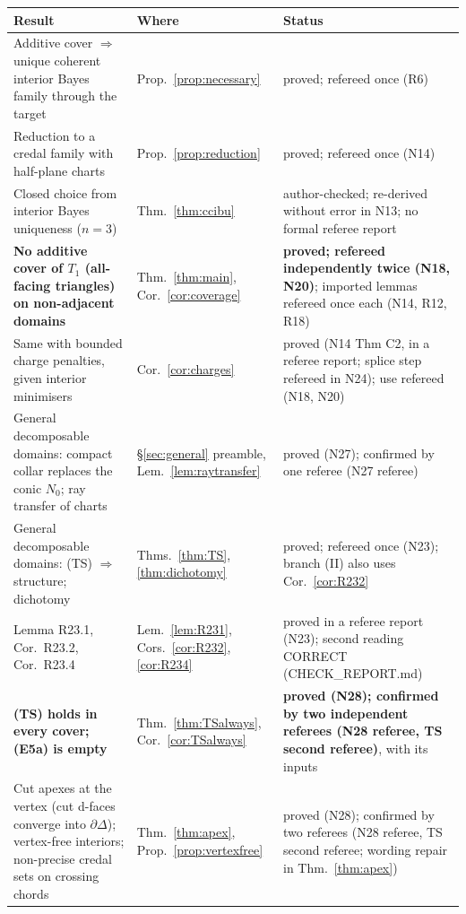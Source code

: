 \documentclass[11pt]{article}
\theoremstyle{definition}
\theoremstyle{remark}
\begin{document}
{\small
\begin{longtable}{>{\raggedright\arraybackslash}p{6.4cm}>{\raggedright\arraybackslash}p{2.1cm}>{\raggedright\arraybackslash}p{5.6cm}}
\toprule
Result & Where & Status\\
\midrule
\endhead
Additive cover $\Rightarrow$ unique coherent interior Bayes family through the target & Prop.~\ref{prop:necessary} & proved; refereed once (R6)\\
Reduction to a credal family with half-plane charts & Prop.~\ref{prop:reduction} & proved; refereed once (N14)\\
Closed choice from interior Bayes uniqueness ($n=3$) & Thm.~\ref{thm:ccibu} & author-checked; re-derived without error in N13; no formal referee report\\
\textbf{No additive cover of $T_1$ (all-facing triangles) on non-adjacent domains} & Thm.~\ref{thm:main}, Cor.~\ref{cor:coverage} & \textbf{proved; refereed independently twice (N18, N20)}; imported lemmas refereed once each (N14, R12, R18)\\
Same with bounded charge penalties, given interior minimisers & Cor.~\ref{cor:charges} & proved (N14 Thm C2, in a referee report; splice step refereed in N24); use refereed (N18, N20)\\
General decomposable domains: compact collar replaces the conic $N_0$; ray transfer of charts & \S\ref{sec:general} preamble, Lem.~\ref{lem:raytransfer} & proved (N27); confirmed by one referee (N27 referee)\\
General decomposable domains: (TS) $\Rightarrow$ structure; dichotomy & Thms.~\ref{thm:TS}, \ref{thm:dichotomy} & proved; refereed once (N23); branch (II) also uses Cor.~\ref{cor:R232}\\
Lemma R23.1, Cor.\ R23.2, Cor.\ R23.4 & Lem.~\ref{lem:R231}, Cors.~\ref{cor:R232}, \ref{cor:R234} & proved in a referee report (N23); second reading CORRECT (CHECK\_REPORT.md)\\
\textbf{(TS) holds in every cover; (E5a) is empty} & Thm.~\ref{thm:TSalways}, Cor.~\ref{cor:TSalways} & \textbf{proved (N28); confirmed by two independent referees (N28 referee, TS second referee)}, with its inputs\\
Cut apexes at the vertex (cut d-faces converge into $\partial\Delta$); vertex-free interiors; non-precise credal sets on crossing chords & Thm.~\ref{thm:apex}, Prop.~\ref{prop:vertexfree} & proved (N28); confirmed by two referees (N28 referee, TS second referee; wording repair in Thm.~\ref{thm:apex})\\

\end{longtable}}
\end{document}
